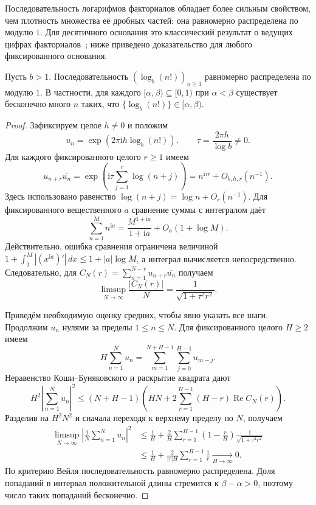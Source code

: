 Последовательность логарифмов факториалов обладает более сильным
свойством, чем плотность множества её дробных частей: она равномерно
распределена по модулю $1$. Для десятичного основания это классический
результат о ведущих цифрах факториалов~\cite{Diaconis1977};
ниже приведено доказательство для любого фиксированного основания.

\begin{lemma}\label{lem:logfact}
Пусть $b>1$. Последовательность $(\log_b(n!))_{n\ge1}$
равномерно распределена по модулю $1$. В частности, для каждого
$[\alpha,\beta)\subseteq[0,1)$ при $\alpha<\beta$ существует
бесконечно много $n$ таких, что
$\{\log_b(n!)\}\in[\alpha,\beta)$.
\end{lemma}
\begin{proof}
Зафиксируем целое $h\ne0$ и положим
\[
 u_n=\exp(2\pi\mathrm i h\log_b(n!)),\qquad
 \tau=\frac{2\pi h}{\log b}\ne0.
\]
Для каждого фиксированного целого $r\ge1$ имеем
\[
 u_{n+r}\overline{u_n}
 =\exp\left(\mathrm i\tau\sum_{j=1}^r\log(n+j)\right)
 =n^{\mathrm i\tau r}+O_{b,h,r}(n^{-1}).
\]
Здесь использовано равенство
$\log(n+j)=\log n+O_r(n^{-1})$.
Для фиксированного вещественного $a$ сравнение суммы с интегралом даёт
\[
 \sum_{n=1}^M n^{\mathrm i a}
 =\frac{M^{1+\mathrm i a}}{1+\mathrm i a}+O_a(1+\log M).
\]
Действительно, ошибка сравнения ограничена величиной
$1+\int_1^M |(x^{\mathrm i a})'|\,dx
\le1+|a|\log M$, а интеграл вычисляется непосредственно.
Следовательно, для
$C_N(r)=\sum_{n=1}^{N-r}u_{n+r}\overline{u_n}$ получаем
\[
 \limsup_{N\to\infty}\frac{|C_N(r)|}{N}
 =\frac1{\sqrt{1+\tau^2r^2}}.
\]

Приведём необходимую оценку средних, чтобы явно указать все шаги.
Продолжим $u_n$ нулями за пределы $1\le n\le N$.
Для фиксированного целого $H\ge2$ имеем
\[
 H\sum_{n=1}^N u_n
 =\sum_{m=1}^{N+H-1}\sum_{j=0}^{H-1}u_{m-j}.
\]
Неравенство Коши--Буняковского и раскрытие квадрата дают
\[
 H^2\left|\sum_{n=1}^N u_n\right|^2
 \le (N+H-1)\left(
 HN+2\sum_{r=1}^{H-1}(H-r)\operatorname{Re}C_N(r)\right).
\]
Разделив на $H^2N^2$ и сначала переходя к верхнему пределу по $N$,
получаем
\[
\begin{aligned}
 \limsup_{N\to\infty}
 \left|\frac1N\sum_{n=1}^N u_n\right|^2
 &\le \frac1H+
 \frac2H\sum_{r=1}^{H-1}
 \left(1-\frac rH\right)\frac1{\sqrt{1+\tau^2r^2}}\\
 &\le \frac1H+\frac{2}{|\tau|H}\sum_{r=1}^{H-1}\frac1r
 \xrightarrow[H\to\infty]{}0.
\end{aligned}
\]
По критерию Вейля последовательность равномерно распределена.
Доля попаданий в интервал положительной длины стремится к
$\beta-\alpha>0$, поэтому число таких попаданий бесконечно.
\end{proof}
